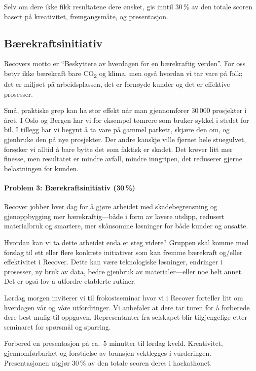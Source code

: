 \documentclass[a4paper]{article}
\begin{document}
Selv om dere ikke fikk resultatene dere ønsket, gis inntil 30\,\% av den totale scoren basert på kreativitet, fremgangsmåte, og presentasjon.

\subsection{Bærekraftsinitiativ}
Recovers motto er ``Beskyttere av hverdagen for en bærekraftig verden''. For oss betyr ikke bærekraft bare CO\textsubscript{2} og klima, men også hvordan vi tar vare på folk; det er miljøet på arbeidsplassen, det er fornøyde kunder og det er effektive prosesser.

Små, praktiske grep kan ha stor effekt når man gjennomfører 30\,000 prosjekter i året. I Oslo og Bergen har vi for eksempel tømrere som bruker sykkel i stedet for bil. I tillegg har vi begynt å ta vare på gammel parkett, skjære den om, og gjenbruke den på nye prosjekter. Der andre kanskje ville fjernet hele stuegulvet, forsøker vi alltid å bare bytte det som faktisk er skadet. Det krever litt mer finesse, men resultatet er mindre avfall, mindre inngripen, det reduserer gjerne belastningen for kunden.

\paragraph{Problem 3: Bærekraftsinitiativ (30\,\%)}
Recover jobber hver dag for å gjøre arbeidet med skadebegrensning og gjenoppbygging mer bærekraftig---både i form av lavere utslipp, redusert materialbruk og smartere, mer skånsomme løsninger for både kunder og ansatte.

Hvordan kan vi ta dette arbeidet enda et steg videre? Gruppen skal komme med forslag til ett eller flere konkrete initiativer som kan fremme bærekraft og/eller effektivitet i Recover. Dette kan være teknologiske løsninger, endringer i prosesser, ny bruk av data, bedre gjenbruk av materialer---eller noe helt annet. Det er også lov å utfordre etablerte rutiner.

Lørdag morgen inviterer vi til frokostseminar hvor vi i Recover forteller litt om hverdagen vår og våre utfordringer. Vi anbefaler at dere tar turen for å forberede dere best mulig til oppgaven. Representanter fra selskapet blir tilgjengelige etter seminaret for spørsmål og sparring.

Forbered en presentasjon på ca.\ 5 minutter til lørdag kveld. Kreativitet, gjennomførbarhet og forståelse av bransjen vektlegges i vurderingen. Presentasjonen utgjør 30\,\% av den totale scoren deres i hackathonet.
\end{document}
